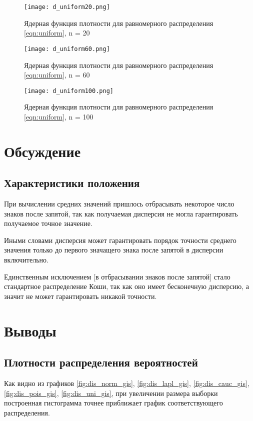 \documentclass[a4]{article}
\begin{document}
\begin{center}
    \begin{figure}[H]
 \caption{Ядерная функция плотности для равномерного распределения \eqref{eqn:uniform}, n = 20}
\texttt{[image: d\_uniform20.png]}
\end{figure}
    \begin{figure}[H]
 \caption{Ядерная функция плотности для равномерного распределения \eqref{eqn:uniform}, n = 60}
\texttt{[image: d\_uniform60.png]}
\end{figure}
    \begin{figure}[H]
 \caption{Ядерная функция плотности для равномерного распределения \eqref{eqn:uniform}, n = 100}
\texttt{[image: d\_uniform100.png]}
\end{figure}
\end{center}
\section{Обсуждение}
\subsection{Характеристики положения}
\par При вычислении средних значений пришлось отбрасывать некоторое число знаков после запятой, так как получаемая дисперсия не могла гарантировать получаемое точное значение. \par Иными словами дисперсия может гарантировать порядок точности среднего значения только до первого значащего знака после запятой в дисперсии включительно. \par Единственным исключением [в отбрасывании знаков после запятой] стало стандартное распределение Коши, так как оно имеет бесконечную дисперсию, а значит не может гарантировать никакой точности.

\section{Выводы}

\subsection{Плотности распределения вероятностей}
\par Как видно из графиков \eqref{fig:dis_norm_gis}, \eqref{fig:dis_lapl_gis}, \eqref{fig:dis_cauc_gis}, \eqref{fig:dis_pois_gis}, \eqref{fig:dis_uni_gis}, при увеличении размера выборки построенная гистограмма точнее приближает график соответствующего распределения.
\end{document}
